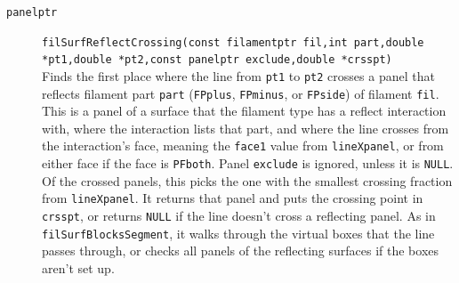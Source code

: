 \documentclass {scrbook}
\newcommand {\ttt} {\texttt}
\begin{document}
\begin{description}
\item[\ttt{panelptr}]
\ttt{filSurfReflectCrossing(const filamentptr fil,int part,double *pt1,double *pt2,const panelptr exclude,double *crsspt)} %
\hfill \\
Finds the first place where the line from \ttt{pt1} to \ttt{pt2} crosses a panel that reflects filament part \ttt{part} (\ttt{FPplus}, \ttt{FPminus}, or \ttt{FPside}) of filament \ttt{fil}. This is a panel of a surface that the filament type has a reflect interaction with, where the interaction lists that part, and where the line crosses from the interaction's face, meaning the \ttt{face1} value from \ttt{lineXpanel}, or from either face if the face is \ttt{PFboth}. Panel \ttt{exclude} is ignored, unless it is \ttt{NULL}. Of the crossed panels, this picks the one with the smallest crossing fraction from \ttt{lineXpanel}. It returns that panel and puts the crossing point in \ttt{crsspt}, or returns \ttt{NULL} if the line doesn't cross a reflecting panel. As in \ttt{filSurfBlocksSegment}, it walks through the virtual boxes that the line passes through, or checks all panels of the reflecting surfaces if the boxes aren't set up.


\end{description}
\end{document}
